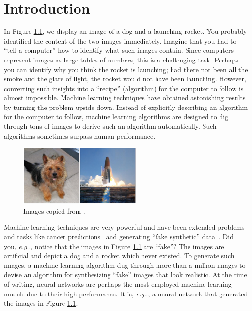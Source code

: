 \documentclass[11pt,a4paper,twoside,openright,final]{memoir}
\makeatletter
\DeclareRobustCommand\onedot{\futurelet\@let@token\@onedot}
\def\@onedot{\ifx\@let@token.\else.\null\fi\xspace}
\def\eg{\emph{e.g}\onedot} \def\Eg{\emph{E.g}\onedot}
\makeatother
\begin{document}
\chapter{Introduction} 
In Figure \ref{fig:biggan-samples}, we display an image of a dog and a launching rocket. 
You probably identified the content of the two images immediately. 
Imagine that you had to ``tell a computer'' how to identify what such images contain.
Since computers represent images as large tables of numbers, this is a challenging task.  
Perhaps you can identify why you think the rocket is launching; had there not been all the smoke and the glare of light, the rocket would not have been launching.
However, converting such insights into a ``recipe'' (algorithm) for the computer to follow is almost impossible.
Machine learning techniques have obtained astonishing results by turning the problem upside down.
Instead of explicitly describing an algorithm for the computer to follow, machine learning algorithms are designed to dig through tons of images to derive such an algorithm automatically. 
Such algorithms sometimes surpass human performance. 

\begin{figure}
    \centering
    \includegraphics[width=0.55\textwidth]{graphics/biggan.png}
    \caption{Images copied from \cite{biggan}.}
    \label{fig:biggan-samples}
\end{figure}

Machine learning techniques are very powerful and have been extended problems and tasks like cancer predictions~\cite{cancer} and generating ``fake synthetic'' data~\cite{biggan}. 
Did you, \eg, notice that the images in Figure \ref{fig:biggan-samples} are ``fake''? 
The images are artificial and depict a dog and a rocket which never existed.
To generate such images, a machine learning algorithm dug through more than a million images to devise an algorithm for synthesizing ``fake'' images that look realistic. 
At the time of writing, neural networks are perhaps the most employed machine learning models due to their high performance. 
It is, \eg, a neural network that generated the images in Figure \ref{fig:biggan-samples}. 
\end{document}
